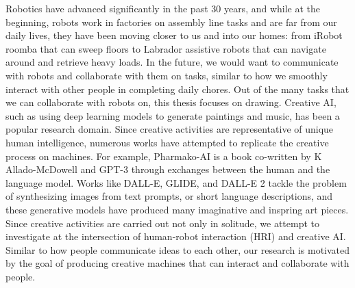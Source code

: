 
 
Robotics have advanced significantly in the past 30 years, and while at the beginning, robots work in factories on assembly line tasks and are far from our daily lives, they have been moving closer to us and into our homes: from iRobot roomba that can sweep floors to Labrador assistive robots that can navigate around and retrieve heavy loads. 
In the future, we would want to communicate with robots and collaborate with them on tasks, similar to how we smoothly interact with other people in completing daily chores.   
Out of the many tasks that we can collaborate with robots on, this thesis focuses on drawing. 
Creative AI, such as using deep learning models to generate paintings and music, has been a popular research domain. Since creative activities are representative of unique human intelligence, numerous works have attempted to replicate the creative process on machines.
For example, Pharmako-AI \citep{allado-mcdowell_okojie_2020} is a book co-written by K Allado-McDowell and GPT-3 \citep{gpt3} through exchanges between the human and the language model. 
Works like DALL-E, GLIDE, and DALL-E 2 tackle the problem of synthesizing images from text prompts, or short language descriptions, and these generative models have produced many imaginative and inspring art pieces. 
Since creative activities are carried out not only in solitude, we attempt to investigate at the intersection of human-robot interaction (HRI) and creative AI. 
Similar to how people communicate ideas to each other, our research is motivated by the goal of producing creative machines that can interact and collaborate with people. 

